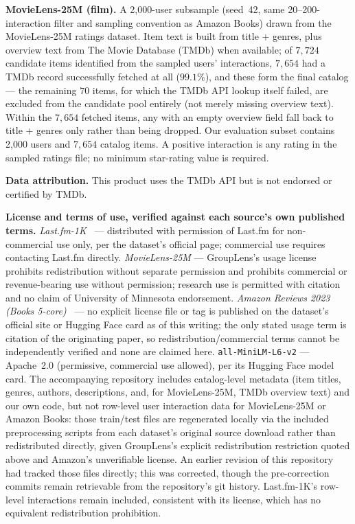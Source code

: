 \documentclass[11pt,a4paper]{article}
\begin{document}
\textbf{MovieLens-25M (film).} A 2{,}000-user subsample (seed~42, same
20--200-interaction filter and sampling convention as Amazon Books) drawn
from the MovieLens-25M ratings dataset. Item text is built from title +
genres, plus overview text from The Movie Database (TMDb) when available;
of $7{,}724$ candidate items identified from the sampled users'
interactions, $7{,}654$ had a TMDb record successfully fetched at all
($99.1\%$), and these form the final catalog --- the remaining $70$ items,
for which the TMDb API lookup itself failed, are excluded from the
candidate pool entirely (not merely missing overview text). Within the
$7{,}654$ fetched items, any with an empty overview field fall back to
title + genres only rather than being dropped. Our
evaluation subset contains 2{,}000 users and $7{,}654$ catalog items. A
positive interaction is any rating in the sampled ratings file; no minimum
star-rating value is required.

\textbf{Data attribution.} This product uses the TMDb API but is not
endorsed or certified by TMDb.

\textbf{License and terms of use, verified against each source's own
published terms.} \emph{Last.fm-1K}~\cite{celma2010} --- distributed
with permission of Last.fm for non-commercial use only, per the
dataset's official page; commercial use requires contacting Last.fm
directly. \emph{MovieLens-25M} --- GroupLens's usage license prohibits
redistribution without separate permission and prohibits commercial or
revenue-bearing use without permission; research use is permitted with
citation and no claim of University of Minnesota endorsement.
\emph{Amazon Reviews 2023 (Books 5-core)}~\cite{hou2024} --- no explicit
license file or tag is published on the dataset's official site or
Hugging Face card as of this writing; the only stated usage term is
citation of the originating paper, so redistribution/commercial terms
cannot be independently verified and none are claimed here.
\texttt{all-MiniLM-L6-v2} --- Apache~2.0 (permissive, commercial use
allowed), per its Hugging Face model card. The accompanying repository
includes catalog-level metadata (item titles, genres, authors,
descriptions, and, for MovieLens-25M, TMDb overview text) and our own
code, but not row-level user interaction data for MovieLens-25M or
Amazon Books: those train/test files are regenerated locally via the
included preprocessing scripts from each dataset's original source
download rather than redistributed directly, given GroupLens's explicit
redistribution restriction quoted above and Amazon's unverifiable
license. An earlier revision of this repository had tracked those files
directly; this was corrected, though the pre-correction commits remain
retrievable from the repository's git history. Last.fm-1K's row-level
interactions remain included, consistent with its license, which has no
equivalent redistribution prohibition.
\end{document}
